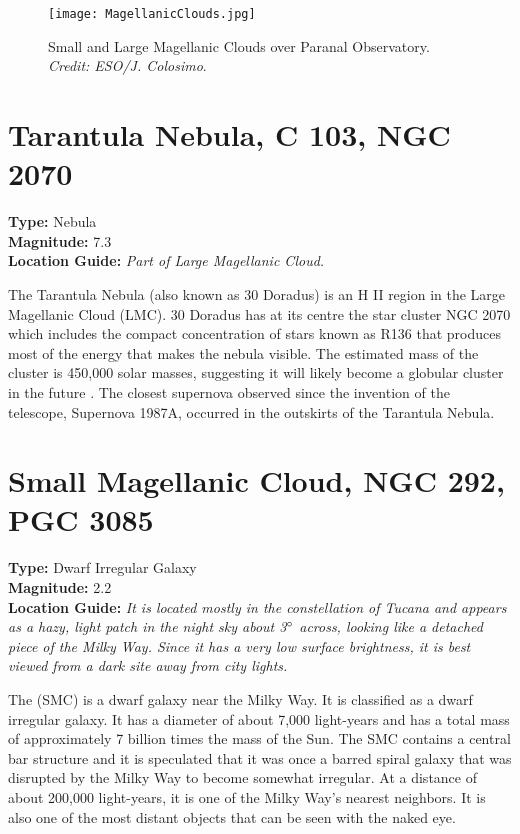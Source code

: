 \begin{figure}[ht]
\texttt{[image: MagellanicClouds.jpg]}
\caption{Small and Large Magellanic Clouds over Paranal Observatory. \emph{Credit: ESO/J. Colosimo}.}
\label{fig:MagellanicClouds}
\end{figure}

\section{Tarantula Nebula, C 103, NGC 2070}
\textbf{Type:} Nebula \\
\textbf{Magnitude:} 7.3 \\ 
\textbf{Location Guide:} \textit{Part of Large Magellanic Cloud.}

The Tarantula Nebula (also known as 30 Doradus) is an H II region in
the Large Magellanic Cloud (LMC). 30 Doradus has at its centre the
star cluster NGC 2070 which includes the compact concentration of
stars known as R136 that produces most of the energy that makes the
nebula visible. The estimated mass of the cluster is 450,000 solar
masses, suggesting it will likely become a globular cluster in the
future \citep{2009AJ....137.3437B}. The closest supernova observed
since the invention of the telescope, Supernova 1987A, occurred in the
outskirts of the Tarantula Nebula.

\section{Small Magellanic Cloud, NGC 292, PGC 3085}
\textbf{Type:} Dwarf Irregular Galaxy \\
\textbf{Magnitude:} 2.2 \\
\textbf{Location Guide:} \textit{It is located mostly in the
  constellation of Tucana and appears as a hazy, light patch in the
  night sky about 3$\degree$ across, looking like a detached piece of
  the Milky Way. Since it has a very low surface brightness, it is
  best viewed from a dark site away from city lights.}

The  (SMC) is a dwarf galaxy near
the Milky Way. It is classified as a dwarf irregular galaxy. It has a
diameter of about 7,000 light-years and has a total mass of
approximately 7 billion times the mass of the Sun. The SMC contains a
central bar structure and it is speculated that it was once a barred
spiral galaxy that was disrupted by the Milky Way to become somewhat
irregular. At a distance of about 200,000 light-years, it is one of
the Milky Way's nearest neighbors. It is also one of the most distant
objects that can be seen with the naked eye.

